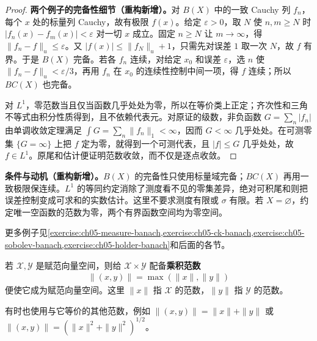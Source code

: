\documentclass[../../main.tex]{subfiles}
\begin{document}
\begin{proof}
\textbf{两个例子的完备性细节（重构新增）。}对 $B(X)$ 中的一致 Cauchy 列 $f_n$，每个 $x$ 处的标量列 Cauchy，故有极限 $f(x)$。给定 $\varepsilon>0$，取 $N$ 使 $n,m\ge N$ 时 $|f_n(x)-f_m(x)|<\varepsilon$ 对一切 $x$ 成立。固定 $n\ge N$ 让 $m\to\infty$，得 $\|f_n-f\|_u\le\varepsilon$。又 $|f(x)|\le\|f_N\|_u+1$，只需先对误差 $1$ 取一次 $N$，故 $f$ 有界。于是 $B(X)$ 完备。若各 $f_n$ 连续，对给定 $x_0$ 和误差 $\varepsilon$，选 $n$ 使 $\|f_n-f\|_u<\varepsilon/3$，再用 $f_n$ 在 $x_0$ 的连续性控制中间一项，得 $f$ 连续；所以 $BC(X)$ 也完备。

对 $L^1$，零范数当且仅当函数几乎处处为零，所以在等价类上正定；齐次性和三角不等式由积分性质得到，且不依赖代表元。对原证的级数，非负函数 $G=\sum_n|f_n|$ 由单调收敛定理满足 $\int G=\sum_n\|f_n\|_1<\infty$，因而 $G<\infty$ 几乎处处。在可测零集 $\{G=\infty\}$ 上把 $f$ 定为零，就得到一个可测代表，且 $|f|\le G$ 几乎处处，故 $f\in L^1$。原尾和估计便证明范数收敛，而不仅是逐点收敛。
\end{proof}
\begin{remark}
\textbf{条件与动机（重构新增）。}$B(X)$ 的完备性只使用标量域完备；$BC(X)$ 再用一致极限保连续。$L^1$ 的等同约定消除了测度看不见的零集差异，绝对可积尾和则把误差控制变成可求和的实数估计。这里不要求测度有限或 $\sigma$ 有限。若 $X=\varnothing$，约定唯一空函数的范数为零，两个有界函数空间均为零空间。
\end{remark}
更多例子见\cref{exercise:ch05-measure-banach,exercise:ch05-ck-banach,exercise:ch05-sobolev-banach,exercise:ch05-holder-banach}和后面的各节。
\begin{definition}[乘积范数]\label{definition:ch05-product-norm}
若 $\mathcal X,\mathcal Y$ 是赋范向量空间，则给 $\mathcal X\times\mathcal Y$ 配备\textbf{乘积范数}
\begin{align*}
\|(x,y)\|=\max(\|x\|,\|y\|)
\end{align*}
便使它成为赋范向量空间。这里 $\|x\|$ 指 $\mathcal X$ 的范数，$\|y\|$ 指 $\mathcal Y$ 的范数。
\end{definition}
有时也使用与它等价的其他范数，例如 $\|(x,y)\|=\|x\|+\|y\|$ 或 $\|(x,y)\|=(\|x\|^2+\|y\|^2)^{1/2}$。
\end{document}
